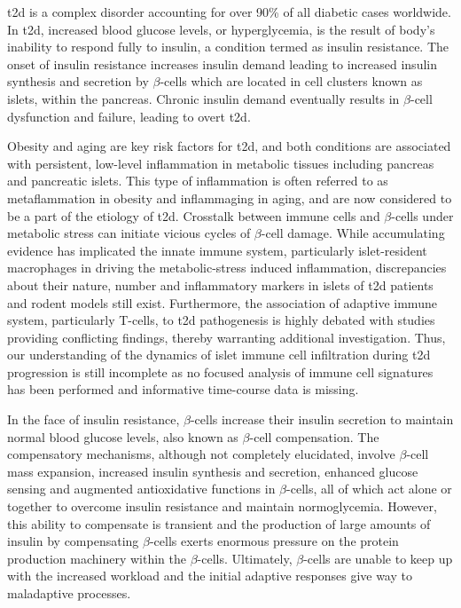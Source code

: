 \par \acrfull{t2d} is a complex disorder accounting for over 90\% of all diabetic cases worldwide. In \gls{t2d}, increased blood glucose levels, or hyperglycemia, is the result of body's inability to respond fully to insulin, a condition termed as insulin resistance. The onset of insulin resistance increases insulin demand leading to increased insulin synthesis and secretion by $\beta$-cells which are located in cell clusters known as islets, within the pancreas. Chronic insulin demand eventually results in $\beta$-cell dysfunction and failure, leading to overt \gls{t2d}.\\
\par Obesity and aging are key risk factors for \gls{t2d}, and both conditions are associated with persistent, low-level inflammation in metabolic tissues including pancreas and pancreatic islets. This type of inflammation is often referred to as metaflammation in obesity and inflammaging in aging, and are now considered to be a part of the etiology of \gls{t2d}. Crosstalk between immune cells and $\beta$-cells under metabolic stress can initiate vicious cycles of $\beta$-cell damage. While accumulating evidence has implicated the innate immune system, particularly islet-resident macrophages in driving the metabolic-stress induced inflammation, discrepancies about their nature, number and inflammatory markers in islets of \gls{t2d} patients and rodent models still exist. Furthermore, the association of adaptive immune system, particularly T-cells, to \gls{t2d} pathogenesis is highly debated with studies providing conflicting findings, thereby warranting additional investigation. Thus, our understanding of the dynamics of islet immune cell infiltration during \gls{t2d} progression is still incomplete as no focused analysis of immune cell signatures has been performed and informative time-course data is missing.\\
\par In the face of insulin resistance, $\beta$-cells increase their insulin secretion to maintain normal blood glucose levels, also known as $\beta$-cell compensation. The compensatory mechanisms, although not completely elucidated, involve $\beta$-cell mass expansion, increased insulin synthesis and secretion, enhanced glucose sensing and augmented antioxidative functions in $\beta$-cells, all of which act alone or together to overcome insulin resistance and maintain normoglycemia. However, this ability to compensate is transient and the production of large amounts of insulin by compensating $\beta$-cells exerts enormous pressure on the protein production machinery within the $\beta$-cells. Ultimately, $\beta$-cells are unable to keep up with the increased workload and the initial adaptive responses give way to maladaptive processes. 

